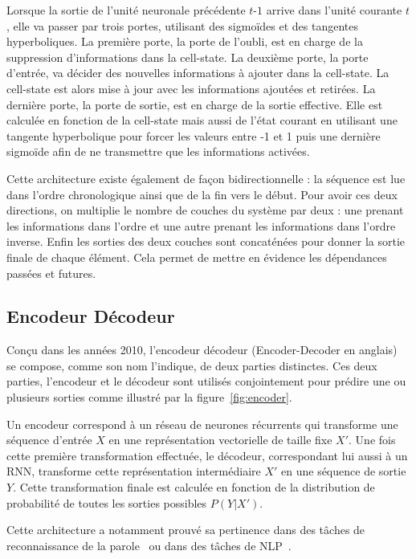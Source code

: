 Lorsque la sortie de l'unité neuronale précédente $t$-$1$ arrive dans l'unité courante $t$, elle va passer par trois portes, utilisant des sigmoïdes et des tangentes hyperboliques. La première porte, la porte de l'oubli, est en charge de la suppression d'informations dans la cell-state. La deuxième porte, la porte d'entrée, va décider des nouvelles informations à ajouter dans la cell-state. La cell-state est alors mise à jour avec les informations ajoutées et retirées. La dernière porte, la porte de sortie, est en charge de la sortie effective. Elle est calculée en fonction de la cell-state mais aussi de l'état courant en utilisant une tangente hyperbolique pour forcer les valeurs entre -1 et 1 puis une dernière sigmoïde afin de ne transmettre que les informations activées.

Cette architecture existe également de façon bidirectionnelle : la séquence est lue dans l'ordre chronologique ainsi que de la fin vers le début. Pour avoir ces deux directions, on multiplie le nombre de couches du système par deux : une prenant les informations dans l'ordre et une autre prenant les informations dans l'ordre inverse. Enfin les sorties des deux couches sont concaténées pour donner la sortie finale de chaque élément. Cela permet de mettre en évidence les dépendances passées et futures.

\subsection{Encodeur Décodeur}


Conçu dans les années 2010, l'encodeur décodeur (Encoder-Decoder en anglais)~\cite{Cho2014} se compose, comme son nom l'indique, de deux parties distinctes. Ces deux parties, l'encodeur et le décodeur sont utilisés conjointement pour prédire une ou plusieurs sorties comme illustré par la figure~\ref{fig:encoder}.

Un encodeur correspond à un réseau de neurones récurrents qui transforme une séquence d'entrée $X$ en une représentation vectorielle de taille fixe $X'$. Une fois cette première transformation effectuée, le décodeur, correspondant lui aussi à un RNN, transforme cette représentation intermédiaire $X'$ en une séquence de sortie $Y$. Cette transformation finale est calculée en fonction de la distribution de probabilité de toutes les sorties possibles $P(Y|X')$.

Cette architecture a notamment prouvé sa pertinence dans des tâches de reconnaissance de la parole~\cite{Chiu2018} ou dans des tâches de NLP~\cite{Hu2019}.


